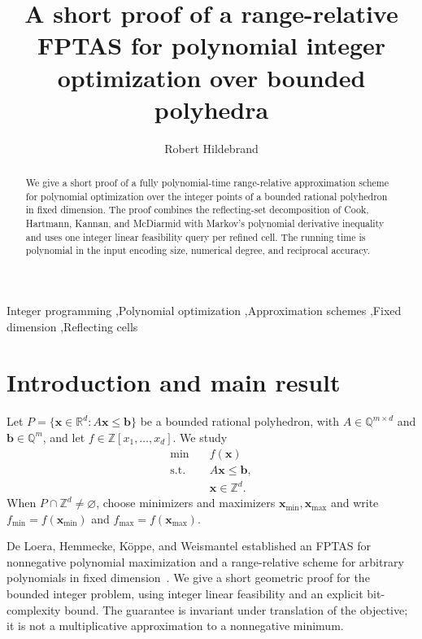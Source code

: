 \documentclass[final,5p,times,twocolumn]{elsarticle}
\theoremstyle{definition}\newtheorem{definition}{Definition}[section]
\theoremstyle{remark}\newtheorem{remark}[theorem]{Remark}
\newcommand{\R}{\mathbb R}\newcommand{\Q}{\mathbb Q}\newcommand{\Z}{\mathbb Z}
\begin{document}
\begin{frontmatter}
\title{A short proof of a range-relative FPTAS for polynomial integer optimization over bounded polyhedra}
\author{Robert Hildebrand}
\begin{abstract}
We give a short proof of a fully polynomial-time range-relative approximation scheme for polynomial optimization over the integer points of a bounded rational polyhedron in fixed dimension. The proof combines the reflecting-set decomposition of Cook, Hartmann, Kannan, and McDiarmid with Markov's polynomial derivative inequality and uses one integer linear feasibility query per refined cell. The running time is polynomial in the input encoding size, numerical degree, and reciprocal accuracy.
\end{abstract}
\begin{keyword}
Integer programming \sep Polynomial optimization \sep Approximation schemes \sep Fixed dimension \sep Reflecting cells
\end{keyword}
\end{frontmatter}

\section{Introduction and main result}

Let $P=\{\mathbf{x}\in\R^d:A\mathbf{x}\le\mathbf b\}$ be a bounded rational polyhedron, with $A\in\Q^{m\times d}$ and $\mathbf b\in\Q^m$, and let $f\in\Z[x_1,\ldots,x_d]$. We study
\begin{equation}\label{eq:problem}
 \begin{aligned}
 \min\quad & f(\mathbf{x})\\
 \text{s.t.}\quad & A\mathbf{x}\le\mathbf b,\\
 & \mathbf{x}\in\Z^d.
 \end{aligned}
\end{equation}
When $P\cap\Z^d\ne\varnothing$, choose minimizers and maximizers $\mathbf{x}_{\min},\mathbf{x}_{\max}$ and write $f_{\min}=f(\mathbf{x}_{\min})$ and $f_{\max}=f(\mathbf{x}_{\max})$.

De Loera, Hemmecke, K\"oppe, and Weismantel established an FPTAS for nonnegative polynomial maximization and a range-relative scheme for arbitrary polynomials in fixed dimension~\cite{DHKW06,DHKW08}. We give a short geometric proof for the bounded integer problem, using integer linear feasibility and an explicit bit-complexity bound. The guarantee is invariant under translation of the objective; it is not a multiplicative approximation to a nonnegative minimum.
\end{document}
